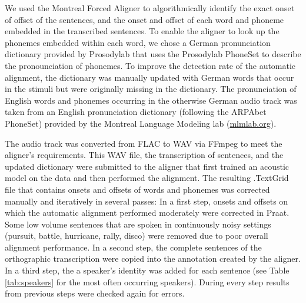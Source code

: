 \documentclass[10pt,a4paper,onecolumn]{article}
\begin{document}
We used the Montreal Forced Aligner \citep{mcauliffe2017montreal} to
algorithmically identify the exact onset of offset of the sentences, and the onset and offset of each word and phoneme embedded in the transcribed sentences.
To enable the aligner to look up the phonemes embedded within each word, we chose a German pronunciation dictionary provided by Prosodylab \citep {gorman2011prosodylab} that uses the Prosodylab PhoneSet to describe the pronounciation of phonemes.
To improve the detection rate of the automatic alignment, the dictionary was manually updated with German words that occur in the stimuli but were originally missing in the dictionary.
The pronunciation of English words and phonemes occurring in the otherwise German audio track was taken from an English pronunciation dictionary (following the ARPAbet PhoneSet) provided by the Montreal Language Modeling lab (\href{http://mlmlab.org/mfa/dictionaries/english.dict}{mlmlab.org}).

The audio track was converted from FLAC to WAV via FFmpeg \citep{ffmpeg} to meet the aligner's requirements.
This WAV file, the transcription of sentences, and the updated dictionary were
submitted to the aligner that first trained an acoustic model on the data and
then performed the alignment.
The resulting .TextGrid file that contains onsets and offsets of words and phonemes was corrected manually and iteratively in several passes:
In a first step, onsets and offsets on which the automatic alignment performed moderately were corrected in Praat.
Some low volume sentences that are spoken in continuously noisy settings (pursuit, battle, hurricane, rally, disco) were removed due to poor overall alignment performance.
In a second step, the complete sentences of the orthographic transcription were copied into the annotation created by the aligner.
In a third step, the a speaker's identity was added for each sentence (see Table \ref{tab:speakers} for the most often occurring speakers).
During every step results from previous steps were checked again for errors.
\end{document}
